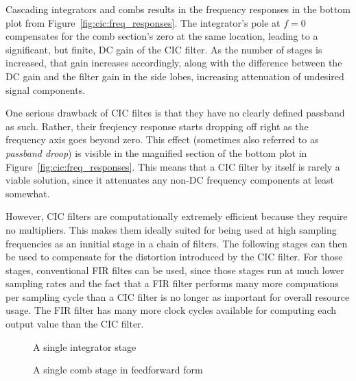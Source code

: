 Cascading  integrators and  combs results  in the  frequency responses  in the
bottom plot from Figure~\ref{fig:cic:freq_responses}. The integrator's pole at
$f = 0$ compensates for the comb  section's zero at the same location, leading
to  a significant,  but  finite, DC  gain  of the  CIC  filter. As the  number
of  stages is  increased,  that  gain increases  accordingly,  along with  the
difference  between  the DC  gain  and  the filter  gain  in  the side  lobes,
increasing attenuation of undesired signal components.

One  serious drawback  of CIC  filtes  is that  they have  no clearly  defined
passband as such. Rather,  their freqiency response starts  dropping off right
as the frequency  axis goes beyond zero. This effect  (sometimes also referred
to as \emph{passband droop}) is visible in the magnified section of the bottom
plot in  Figure~\ref{fig:cic:freq_responses}. This means that a  CIC filter by
itself is rarely  a viable solution, since it attenuates  any non-DC frequency
components at least somewhat.

However,  CIC filters  are  computationally extremely  efficient because  they
require no multipliers. This makes them ideally  suited for being used at high
sampling frequencies as an innitial stage in a chain of filters. The following
stages can then be used to compensate for the distortion introduced by the CIC
filter. For those  stages, conventional  FIR filtes can  be used,  since those
stages  run at  much lower  sampling  rates and  the  fact that  a FIR  filter
performs many  more compuations  per sampling  cycle than a  CIC filter  is no
longer as important  for overall resource usage. The FIR filter  has many more
clock cycles available for computing each output value than the CIC filter.

\begin{figure}
    \centering
    \begin{minipage}[t][][b]{0.45\textwidth}
        \centering
        
        \caption[Integrator Stage]{A single integrator stage}
        \label{fig:filtertopologies:integrator}
    \end{minipage}
    \begin{minipage}[t][][b]{0.45\textwidth}
        \centering
        
        \caption[Comb Stage]{A single comb stage in feedforward form}
        \label{fig:filtertopologies:comb}
    \end{minipage}
\end{figure}

